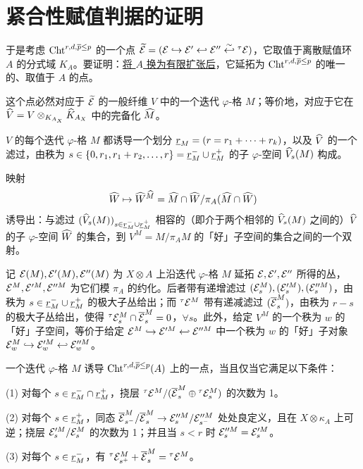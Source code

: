 \section{紧合性赋值判据的证明}

于是考虑 $\mathrm{Cht}^{r,d,\overline p\le p}$ 的一个点 $\widetilde{\mathcal{E}}=(\mathcal{E}\hookrightarrow\mathcal{E}'\hookleftarrow\mathcal{E}''\overset{\sim}{\hookleftarrow}{}^\tau\mathcal{E})$，它取值于离散赋值环 $A$ 的分式域 $K_A$。要证明：\ul{将 $A$ 换为有限扩张后}，它延拓为 $\mathrm{Cht}^{r,d,\overline p\le p}$ 的唯一的、取值于 $A$ 的点。

这个点必然对应于 $\widetilde{\mathcal{E}}$ 的一般纤维 $V$ 中的一个迭代 $\varphi$-格 $M$；等价地，对应于它在 $\widehat V=V\otimes_{K_{A_X}}\widehat K_{A_X}$ 中的完备化 $\widehat M$。

$V$ 的每个迭代 $\varphi$-格 $M$ 都诱导一个划分 $\ul r_M=(r=r_1+\cdots+r_k)$，以及 $\widehat V$ 的一个滤过，由秩为 $s\in\{0,r_1,r_1+r_2,\ldots,r\}=\ul r_M^{-}\cup\ul r_M^{+}$ 的子 $\varphi$-空间 $\widehat V_s(M)$ 构成。

映射
\[ \widehat W\mapsto\widehat W^{\widehat M}=\widehat M\cap\widehat W/\pi_A(\widehat M\cap\widehat W) \]
诱导出：与滤过 $(\wh V_s(M))_{s\in\ul r_M^{-}\cup\ul r_M^{+}}$ 相容的（即介于两个相邻的 $\widehat V_s(M)$ 之间的）$\widehat V$ 的子 $\varphi$-空间 $\widehat W$ 的集合，到 $V^M=M/\pi_A M$ 的「好」子空间的集合之间的一个双射。

记 $\mathcal{E}(M),\mathcal{E}'(M),\mathcal{E}''(M)$ 为 $X\otimes A$ 上沿迭代 $\varphi$-格 $M$ 延拓 $\mathcal{E},\mathcal{E}',\mathcal{E}''$ 所得的丛，$\mathcal{E}^M,\mathcal{E}'^M,\mathcal{E}''^M$ 为它们模 $\pi_A$ 的约化。后者带有递增滤过 $(\mathcal{E}_s^M),(\mathcal{E}_s'^M),(\mathcal{E}_s''^M)$，由秩为 $s\in\ul r_M^{-}\cup\ul r_M^{+}$ 的极大子丛给出；而 ${}^\tau\mathcal{E}^M$ 带有递减滤过 $(\overline{\mathcal{E}}_s^M)$，由秩为 $r-s$ 的极大子丛给出，使得 ${}^\tau\mathcal{E}_s^M\cap\overline{\mathcal{E}}_s^M=0$，$\forall s$。此外，给定 $V^M$ 的一个秩为 $w$ 的「好」子空间，等价于给定 $\mathcal{E}^M\hookrightarrow\mathcal{E}'^M\hookleftarrow\mathcal{E}''^M$ 中一个秩为 $w$ 的「好」子对象 $\mathcal{E}_w^M\hookrightarrow\mathcal{E}_w'^M\hookleftarrow\mathcal{E}_w''^M$。

一个迭代 $\varphi$-格 $M$ 诱导 $\mathrm{Cht}^{r,d,\overline p\le p}(A)$ 上的一点，当且仅当它满足以下条件：

(1) 对每个 $s\in\ul r_M^{-}\cap\ul r_M^{+}$，挠层 ${}^\tau\mathcal{E}^M/(\overline{\mathcal{E}}_s^M\oplus{}^\tau\mathcal{E}_s^M)$ 的次数为 1。

(2) 对每个 $s\in\ul r_M^{+}$，同态 $\overline{\mathcal{E}}_{s^-}^M/\overline{\mathcal{E}}_s^M\to\mathcal{E}_s''^M/\mathcal{E}_{s^-}''^M$ 处处良定义，且在 $X\otimes\kappa_A$ 上可逆；挠层 $\mathcal{E}_s'^M/\mathcal{E}_s^M$ 的次数为 1；并且当 $s<r$ 时 $\mathcal{E}_s''^M=\mathcal{E}_s'^M$。

(3) 对每个 $s\in\ul r_M^{-}$，有 ${}^\tau\mathcal{E}_{s^+}^M+\overline{\mathcal{E}}_s^M={}^\tau\mathcal{E}^M$。

